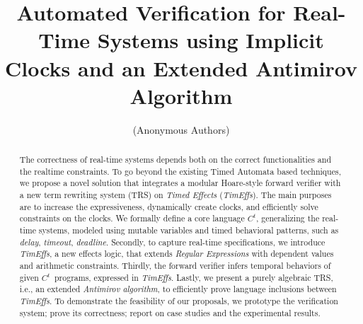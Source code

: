 \documentclass[acmsmall,10pt,review]{acmart}
\newcommand{\timedEffects}{\emph{TimEffs}}
\newcommand{\code}[1]{{\tt{\ensuremath{\m{#1}}}}}
\newcommand{\m}{\mathit}
\newcommand{\timedL}{\code{C^{t}}}
\begin{document}
\title{Automated Verification for Real-Time Systems 
using Implicit Clocks and an Extended Antimirov Algorithm}




\author{(Anonymous Authors)}






\begin{abstract} 
The correctness of real-time systems 
depends both on the correct functionalities and the realtime constraints.
To go beyond the existing Timed Automata based techniques, 
we propose a novel solution that integrates a 
modular Hoare-style forward verifier with a new term rewriting 
system (TRS) on \emph{Timed Effects} (\timedEffects).
The main purposes are to increase the expressiveness,  
dynamically create clocks, 
and efficiently solve constraints on the clocks.  
We formally define 
a core language \timedL, generalizing the real-time systems, modeled 
using mutable variables and timed behavioral patterns, 
such as \emph{delay}, \emph{timeout}, \emph{deadline}. 
Secondly, to capture real-time specifications, 
we introduce \timedEffects, a new effects logic, 
that extends 
\emph{Regular Expressions} with dependent
values and arithmetic constraints.
Thirdly,  the forward verifier infers temporal behaviors of given 
\timedL\ programs, expressed in \timedEffects. 
Lastly, we present a purely algebraic TRS, i.e., an extended \emph{Antimirov algorithm}, to 
efficiently prove language inclusions between 
 \timedEffects. 
To demonstrate the feasibility of our proposals, 
we prototype the verification system; prove its 
correctness; report on case studies and the experimental results. 

 



\end{abstract}
\end{document}
